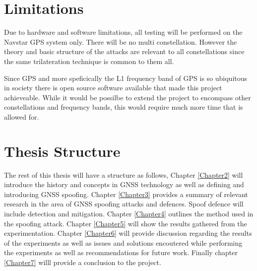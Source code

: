 \section{Limitations}\label{sec:Limits}
Due to hardware and software limitations, all testing will be performed on the Navstar GPS system only. There will be no multi constellation. However the theory and basic
structure of the attacks are relevant to all constellations since the same trilateration technique is common to them all.

Since GPS and more speficically the L1 frequency band of GPS is so ubiquitous in society there is open source software available that made this project achieveable. While
it would be possilbe to extend the project to encompass other constellations and frequency bands, this would require much more time that is allowed for.

\section{Thesis Structure}\label{sec:structure}
The rest of this thesis will have a structure as follows, Chapter \ref{Chapter2} will introduce the history and concepts in GNSS technology as well as defining and
introducing GNSS spoofing. Chapter \ref{Chapter3} provides a summary of relevant research in the area of GNSS spoofing attacks and defences. Spoof defence will include
detection and mitigation. Chapter \ref{Chapter4} outlines the method used in the spoofing attack. Chapter \ref{Chapter5} will show the results gathered from the
experimentation. Chapter \ref{Chapter6} will provide discussion regarding the results of the experiments as well as issues and solutions encoutered while performing the
experiments as well as recommendations for future work. Finally chapter \ref{Chapter7} willl provide a conclusion to the project.